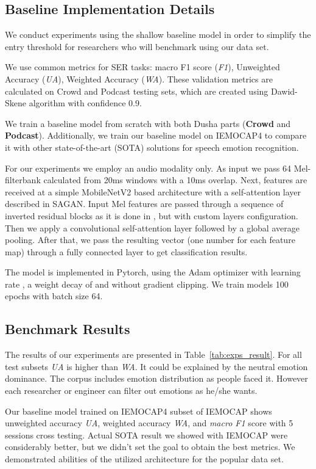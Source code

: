 \documentclass{article}
\begin{document}
\subsection{Baseline Implementation Details}
We conduct experiments using the shallow baseline model in order to simplify the entry threshold for researchers who will benchmark using our data set.

We use common metrics for SER tasks: macro F1 score (\textit{F1}), Unweighted Accuracy (\textit{UA}), Weighted Accuracy (\textit{WA}). These validation metrics are calculated on Crowd and Podcast testing sets, which are created using Dawid-Skene algorithm with confidence  0.9. 

We train a baseline model from scratch with both Dusha parts (\textbf{Crowd} and \textbf{Podcast}). 
Additionally, we train our baseline model on IEMOCAP4 to compare it with other state-of-the-art (SOTA) solutions for speech emotion recognition.

For our experiments we employ an audio modality only. 
As input we pass 64 Mel-filterbank calculated from 20ms windows with a 10ms overlap. 
Next, features are received at a simple MobileNetV2\cite{mobilenetv2} based architecture with a self-attention layer described in SAGAN\cite{zhang2019self}. 
Input Mel features are passed through a sequence of inverted residual blocks as it is done in \cite{mobilenetv2}, but with custom layers configuration.
Then we apply a convolutional self-attention layer followed by a global average pooling.
After that, we pass the resulting vector (one number for each feature map) through a fully connected layer to get classification results.

The model is implemented in Pytorch, using the Adam\cite{adam} optimizer with learning rate , a weight decay of  and without gradient clipping. We train models 100 epochs with batch size 64.

\subsection{Benchmark Results}
The results of our experiments are presented in Table~\ref{tab:exps_result}. For all test subsets \textit{UA} is higher than \textit{WA}. It could be explained by the neutral emotion dominance. The corpus includes emotion distribution as people faced it. However each researcher or engineer can filter out emotions as he/she wants.

Our baseline model trained on IEMOCAP4 subset of IEMOCAP shows  unweighted accuracy \textit{UA},  weighted accuracy \textit{WA}, and  \textit{macro F1} score with 5 sessions cross testing. Actual SOTA result we showed with IEMOCAP were considerably better, but we didn't set the goal to obtain the best metrics. We demonstrated abilities of the utilized architecture for the popular data set.
\end{document}
